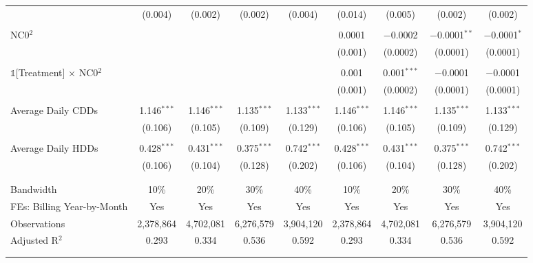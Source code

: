 {\begin{table}[t!]
\begin{adjustbox}{scale = 0.82}
\begin{threeparttable}
\begin{tabular}{@{\extracolsep{1pt}}lcccccccc}
                    & (0.004) & (0.002) & (0.002) & (0.004) & (0.014) & (0.005) & (0.002) & (0.002) \\ 
                    & & & & & & & & \\ 
                    NC0$^{2}$ &  &  &  &  & 0.0001 & $-$0.0002 & $-$0.0001$^{**}$ & $-$0.0001$^{*}$ \\ 
                    &  &  &  &  & (0.001) & (0.0002) & (0.0001) & (0.0001) \\ 
                    & & & & & & & & \\ 
                    $\mathbb{1}$[Treatment] $\times$ NC0$^{2}$ &  &  &  &  & 0.001 & 0.001$^{***}$ & $-$0.0001 & $-$0.0001 \\ 
                    &  &  &  &  & (0.001) & (0.0002) & (0.0001) & (0.0001) \\ 
                    & & & & & & & & \\ 
                    Average Daily CDDs & 1.146$^{***}$ & 1.146$^{***}$ & 1.135$^{***}$ & 1.133$^{***}$ & 1.146$^{***}$ & 1.146$^{***}$ & 1.135$^{***}$ & 1.133$^{***}$ \\ 
                    & (0.106) & (0.105) & (0.109) & (0.129) & (0.106) & (0.105) & (0.109) & (0.129) \\ 
                    & & & & & & & & \\ 
                    Average Daily HDDs & 0.428$^{***}$ & 0.431$^{***}$ & 0.375$^{***}$ & 0.742$^{***}$ & 0.428$^{***}$ & 0.431$^{***}$ & 0.375$^{***}$ & 0.742$^{***}$ \\ 
                    & (0.106) & (0.104) & (0.128) & (0.202) & (0.106) & (0.104) & (0.128) & (0.202) \\ 
                    & & & & & & & & \\
                    \hline
                    \\[-2.0ex]
                    Bandwidth & 10\% & 20\% & 30\% & 40\% & 10\% & 20\% & 30\% & 40\% \\ 
                    FEs: Billing Year-by-Month & Yes & Yes & Yes & Yes & Yes & Yes & Yes & Yes \\ 
                    Observations & 2,378,864 & 4,702,081 & 6,276,579 & 3,904,120 & 2,378,864 & 4,702,081 & 6,276,579 & 3,904,120 \\ 
                    Adjusted R$^{2}$ & 0.293 & 0.334 & 0.536 & 0.592 & 0.293 & 0.334 & 0.536 & 0.592 \\ 
                    \\[-2.0ex]
                    \hline \hline
                    \\[-4.5ex]

\end{tabular}
\end{threeparttable}
\end{adjustbox}
\end{table}}
